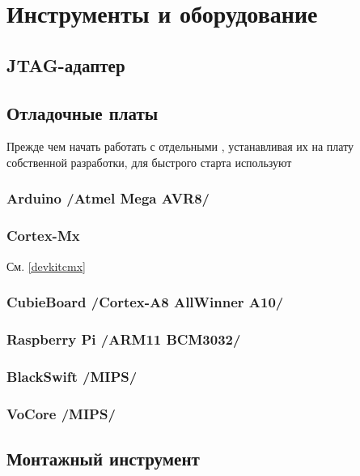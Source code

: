 \chapter{Инструменты и оборудование}

\section{JTAG-адаптер}

% 
% 

\section{Отладочные платы}

Прежде чем начать работать с отдельными \mk, устанавливая их на плату
собственной разработки, для быстрого старта используют 

\subsection{Arduino /Atmel Mega AVR8/}

\subsection{Cortex-Mx} См. \ref{devkitcmx}

\subsection{CubieBoard /Cortex-A8 AllWinner A10/}

\subsection{Raspberry Pi /ARM11 BCM3032/}

\subsection{BlackSwift /MIPS/}

\subsection{VoCore /MIPS/}

\section{Монтажный инструмент}

